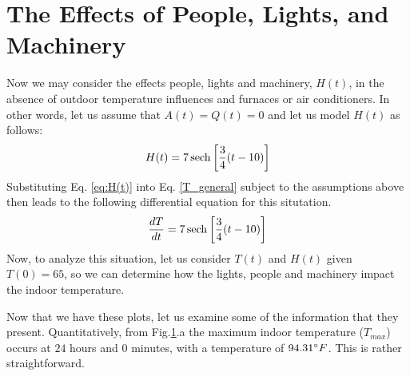 \documentclass[titlepage]{article}
\begin{document}
\section{The Effects of People, Lights, and Machinery}\label{lights}
Now we may consider the effects people, lights and machinery, $H(t)$, in the absence of outdoor temperature influences and furnaces or air conditioners.
In other words, let us assume that $A(t)=Q(t)=0$ and let us model $H(t)$ as follows:
\begin{equation}\label{eq:H(t)}
    H(t) = 7\operatorname{sech}\left[\frac{3}{4}(t-10)\right]
\end{equation}
Substituting Eq. \ref{eq:H(t)} into Eq. \ref{T_general} subject to the assumptions above then leads to the following differential equation for this situtation.
\begin{equation} \label{eq:lights}
    \frac{dT}{dt} = 7\operatorname{sech}\left[\frac{3}{4}(t-10)\right]
\end{equation}
Now, to analyze this situation, let us consider $T(t)$ and $H(t)$  given $T(0)=65$, so we can determine how the lights, people and machinery impact the indoor temperature.
\begin{figure}[H]
    \centering
    \qquad
    \caption{}%
    \label{fig:lights}%
\end{figure}
Now that we have these plots, let us examine some of the information that they present.
Quantitatively, from Fig.\ref{fig:lights}.a the maximum indoor temperature ($T_{max}$) occurs at $24$ hours 
and $0$ minutes, with a temperature of $94.31\degree F$. This is rather straightforward.
\end{document}
